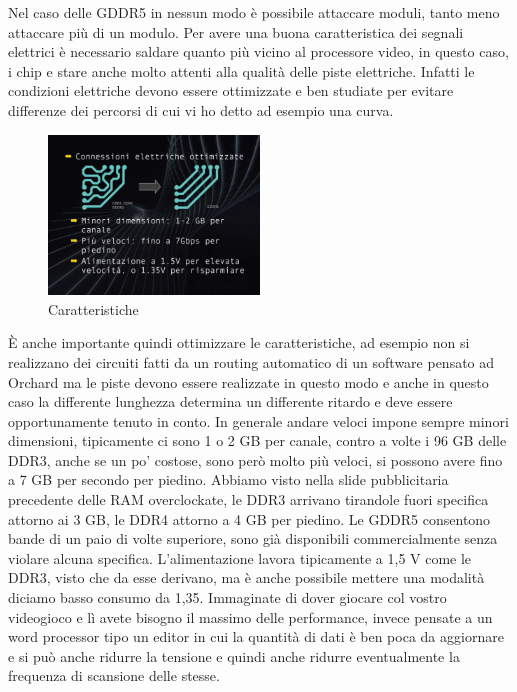 Nel caso delle GDDR5 in nessun modo è possibile attaccare moduli, tanto meno attaccare più di un modulo.
Per avere una buona caratteristica dei segnali elettrici è necessario saldare quanto più vicino al processore video, in questo caso, i chip e stare anche molto attenti alla qualità delle piste elettriche.
Infatti le condizioni elettriche devono essere ottimizzate e ben studiate per evitare differenze dei percorsi di cui vi ho detto ad esempio una curva.

\FloatBarrier
\begin{figure}[H]
  \centering
  \includegraphics[width=0.50\textwidth,
                    trim=40 40 40 40, %
                    clip]
                    {images/Lez05_p03_fig_02.png}
  \caption{Caratteristiche}
  \label{fig:Lez05_p03_fig_02}
\end{figure}
\FloatBarrier
\noindent

È anche importante quindi ottimizzare le caratteristiche, ad esempio non si realizzano dei circuiti fatti da un routing automatico di un software pensato ad Orchard ma le piste devono essere realizzate in questo modo e anche in questo caso la differente lunghezza determina un differente ritardo e deve essere opportunamente tenuto in conto.
In generale andare veloci impone sempre minori dimensioni, tipicamente ci sono 1 o 2 GB per canale, contro a volte i 96 GB delle DDR3, anche se un po' costose, sono però molto più veloci, si possono avere fino a 7 GB per secondo per piedino.
Abbiamo visto nella slide pubblicitaria precedente delle RAM overclockate, le DDR3 arrivano tirandole fuori specifica attorno ai 3 GB, le DDR4 attorno a 4 GB per piedino.
Le GDDR5 consentono bande di un paio di volte superiore, sono già disponibili commercialmente senza violare alcuna specifica.
L'alimentazione lavora tipicamente a 1,5 V come le DDR3, visto che da esse derivano, ma è anche possibile mettere una modalità diciamo basso consumo da 1,35.
Immaginate di dover giocare col vostro videogioco e lì avete bisogno il massimo delle performance, invece pensate a un word processor tipo un editor in cui la quantità di dati è ben poca da aggiornare e si può anche ridurre la tensione e quindi anche ridurre eventualmente la frequenza di scansione delle stesse.

